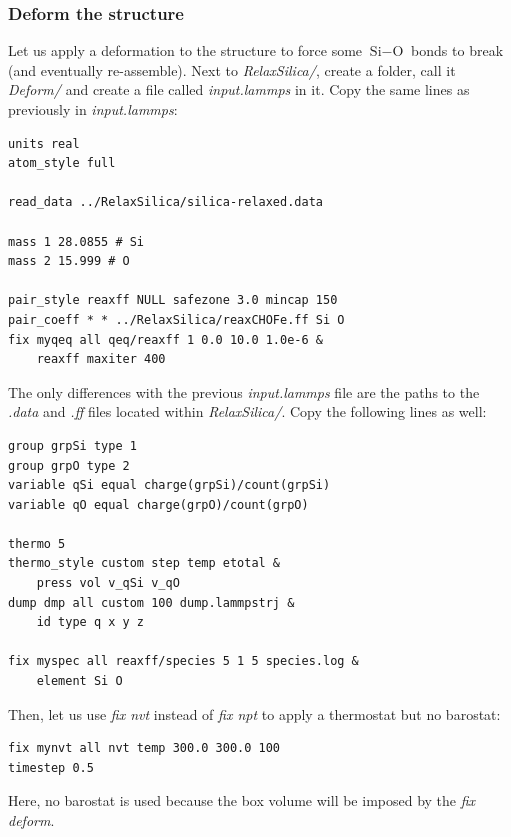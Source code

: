 \documentclass[9pt,tutorial]{livecoms}
\begin{document}
\subsubsection{Deform the structure}
Let us apply a deformation to the structure to force some $\text{Si}-\text{O}$ bonds to break (and eventually re-assemble). Next to \textit{RelaxSilica/}, create a folder, call it \textit{Deform/} and create a file called \textit{input.lammps} in it. Copy the same lines as previously in \textit{input.lammps}:
{\normalsize \begin{verbatim}
units real
atom_style full

read_data ../RelaxSilica/silica-relaxed.data

mass 1 28.0855 # Si
mass 2 15.999 # O

pair_style reaxff NULL safezone 3.0 mincap 150
pair_coeff * * ../RelaxSilica/reaxCHOFe.ff Si O
fix myqeq all qeq/reaxff 1 0.0 10.0 1.0e-6 &
    reaxff maxiter 400
\end{verbatim}}
The only differences with the previous \textit{input.lammps} file are the paths to the \textit{.data} and \textit{.ff} files located within \textit{RelaxSilica/}. Copy the following lines as well:
{\normalsize \begin{verbatim}
group grpSi type 1
group grpO type 2
variable qSi equal charge(grpSi)/count(grpSi)
variable qO equal charge(grpO)/count(grpO)

thermo 5
thermo_style custom step temp etotal &
    press vol v_qSi v_qO
dump dmp all custom 100 dump.lammpstrj &
    id type q x y z

fix myspec all reaxff/species 5 1 5 species.log &
    element Si O
\end{verbatim}}
Then, let us use \textit{fix nvt} instead of \textit{fix npt} to apply a thermostat but no barostat:
{\normalsize \begin{verbatim}
fix mynvt all nvt temp 300.0 300.0 100
timestep 0.5
\end{verbatim}}
Here, no barostat is used because the box volume will be imposed by the \textit{fix deform}.
\end{document}

